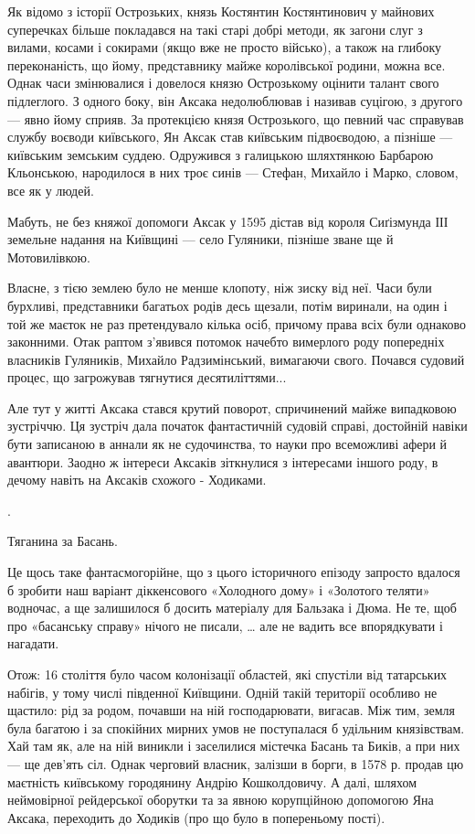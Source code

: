 Як відомо з історії Острозьких, князь Костянтин Костянтинович у майнових
суперечках більше покладався на такі старі добрі методи, як загони слуг з
вилами, косами і сокирами (якщо вже не просто військо), а також на глибоку
переконаність, що йому, представнику майже королівської родини, можна все.
Однак часи змінювалися і довелося князю Острозькому оцінити талант свого
підлеглого. З одного боку, він Аксака недолюблював і називав суцігою, з другого
— явно йому сприяв. За протекцією князя Острозького, що певний час справував
службу воєводи київського, Ян Аксак став київським підвоєводою, а пізніше —
київським земським суддею. Одружився з галицькою шляхтянкою Барбарою
Кльонською, народилося в них троє синів — Стефан, Михайло і Марко, словом, все
як у людей.

Мабуть, не без княжої допомоги Аксак у 1595 дістав від короля Сиґізмунда ІІІ
земельне надання на Київщині — село Гуляники, пізніше зване ще й Мотовилівкою.

Власне, з тією землею було не менше клопоту, ніж зиску від неї. Часи були
бурхливі, представники багатьох родів десь щезали, потім виринали, на один і
той же маєток не раз претендувало кілька осіб, причому права всіх були однаково
законними. Отак раптом з’явився потомок начебто вимерлого роду попередніх
власників Гуляників, Михайло Радзимінський, вимагаючи свого. Почався судовий
процес, що загрожував тягнутися десятиліттями...

Але тут у житті Аксака стався крутий поворот, спричинений майже випадковою
зустріччю. Ця зустріч дала початок фантастичній судовій справі, достойній
навіки бути записаною в аннали як не судочинства, то науки про всеможливі афери
й авантюри. Заодно ж інтереси Аксаків зіткнулися з інтересами іншого роду, в
дечому навіть на Аксаків схожого - Ходиками.

.

Тяганина за Басань.

Це щось таке фантасмогорійне, що з цього історичного епізоду запросто вдалося б
зробити наш варіант діккенсового «Холодного дому» і «Золотого теляти» водночас,
а ще залишилося б досить матеріалу для Бальзака і Дюма. Не те, щоб про
«басанську справу» нічого не писали, … але не вадить все впорядкувати і
нагадати. 

Отож: 16 століття було часом колонізації областей, які спустіли від татарських
набігів, у тому числі південної Київщини. Одній такій території особливо не
щастило: рід за родом, почавши на ній господарювати, вигасав. Між тим, земля
була багатою і за спокійних мирних умов не поступалася б удільним князівствам.
Хай там як, але на ній виникли і заселилися містечка Басань та Биків, а при них
— ще дев’ять сіл. Однак черговий власник, залізши в борги, в 1578 р. продав цю
маєтність київському городянину Андрію Кошколдовичу. А далі, шляхом неймовірної
рейдерської оборутки та за явною корупційною допомогою Яна Аксака, переходить
до Ходиків (про що було в попереньому пості).

